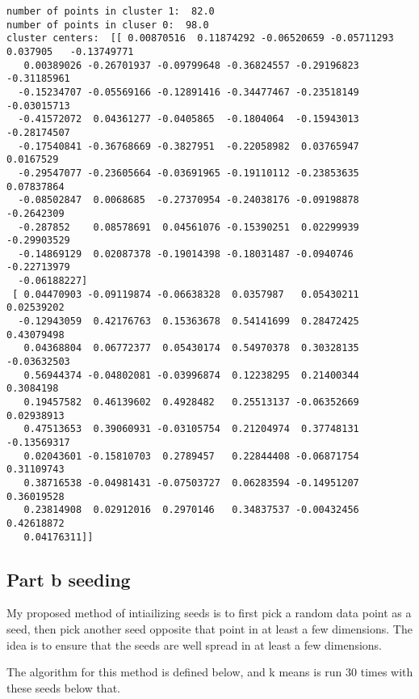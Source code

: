 \documentclass[11pt]{article}
\begin{document}
    \begin{Verbatim}[commandchars=\\\{\}]
number of points in cluster 1:  82.0
number of points in cluser 0:  98.0
cluster centers:  [[ 0.00870516  0.11874292 -0.06520659 -0.05711293  0.037905   -0.13749771
   0.00389026 -0.26701937 -0.09799648 -0.36824557 -0.29196823 -0.31185961
  -0.15234707 -0.05569166 -0.12891416 -0.34477467 -0.23518149 -0.03015713
  -0.41572072  0.04361277 -0.0405865  -0.1804064  -0.15943013 -0.28174507
  -0.17540841 -0.36768669 -0.3827951  -0.22058982  0.03765947  0.0167529
  -0.29547077 -0.23605664 -0.03691965 -0.19110112 -0.23853635  0.07837864
  -0.08502847  0.0068685  -0.27370954 -0.24038176 -0.09198878 -0.2642309
  -0.287852    0.08578691  0.04561076 -0.15390251  0.02299939 -0.29903529
  -0.14869129  0.02087378 -0.19014398 -0.18031487 -0.0940746  -0.22713979
  -0.06188227]
 [ 0.04470903 -0.09119874 -0.06638328  0.0357987   0.05430211  0.02539202
  -0.12943059  0.42176763  0.15363678  0.54141699  0.28472425  0.43079498
   0.04368804  0.06772377  0.05430174  0.54970378  0.30328135 -0.03632503
   0.56944374 -0.04802081 -0.03996874  0.12238295  0.21400344  0.3084198
   0.19457582  0.46139602  0.4928482   0.25513137 -0.06352669  0.02938913
   0.47513653  0.39060931 -0.03105754  0.21204974  0.37748131 -0.13569317
   0.02043601 -0.15810703  0.2789457   0.22844408 -0.06871754  0.31109743
   0.38716538 -0.04981431 -0.07503727  0.06283594 -0.14951207  0.36019528
   0.23814908  0.02912016  0.2970146   0.34837537 -0.00432456  0.42618872
   0.04176311]]

    \end{Verbatim}

    \subsection{Part b seeding}\label{part-b-seeding}

My proposed method of intiailizing seeds is to first pick a random data
point as a seed, then pick another seed opposite that point in at least
a few dimensions. The idea is to ensure that the seeds are well spread
in at least a few dimensions.

The algorithm for this method is defined below, and k means is run 30
times with these seeds below that.
\end{document}
